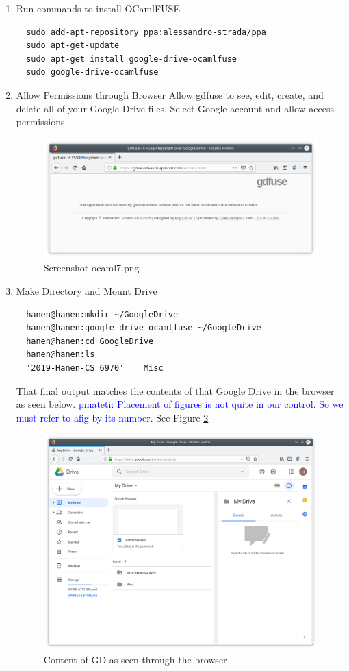 \documentclass{article}
\newcommand{\PM}[1]{\textcolor{Blue}{pmateti: #1}}%
\begin{document}
\begin{enumerate}
\item Run commands to install OCamlFUSE
\begin{verbatim}
  sudo add-apt-repository ppa:alessandro-strada/ppa
  sudo apt-get-update
  sudo apt-get install google-drive-ocamlfuse
  sudo google-drive-ocamlfuse
\end{verbatim}
\item Allow Permissions through Browser 
  Allow gdfuse to see, edit, create, and delete all of your Google Drive files. 
  Select Google account and allow access permissions.
  \begin{figure}[htb]
    \centering
    \includegraphics[scale=0.47]{ocaml7.png}
    \caption{Screenshot ocaml7.png}        %
    \label{fig:ocaml7}
  \end{figure}
\item Make Directory and Mount Drive
\begin{verbatim}
  hanen@hanen:mkdir ~/GoogleDrive
  hanen@hanen:google-drive-ocamlfuse ~/GoogleDrive
  hanen@hanen:cd GoogleDrive
  hanen@hanen:ls
  '2019-Hanen-CS 6970'    Misc
\end{verbatim}
That final output matches the contents of that Google Drive in the
browser as seen below.  \PM{Placement of figures is not quite in our
  control.  So we must refer to afig by its number.}  See Figure
\ref{fig:ocaml10}
\begin{figure}[htb]
  \centering
  \includegraphics[scale=0.4]{ocaml10.png}
  \caption{Content of GD as seen through the browser} %
  \label{fig:ocaml10}
\end{figure}
\end{enumerate}
\end{document}
